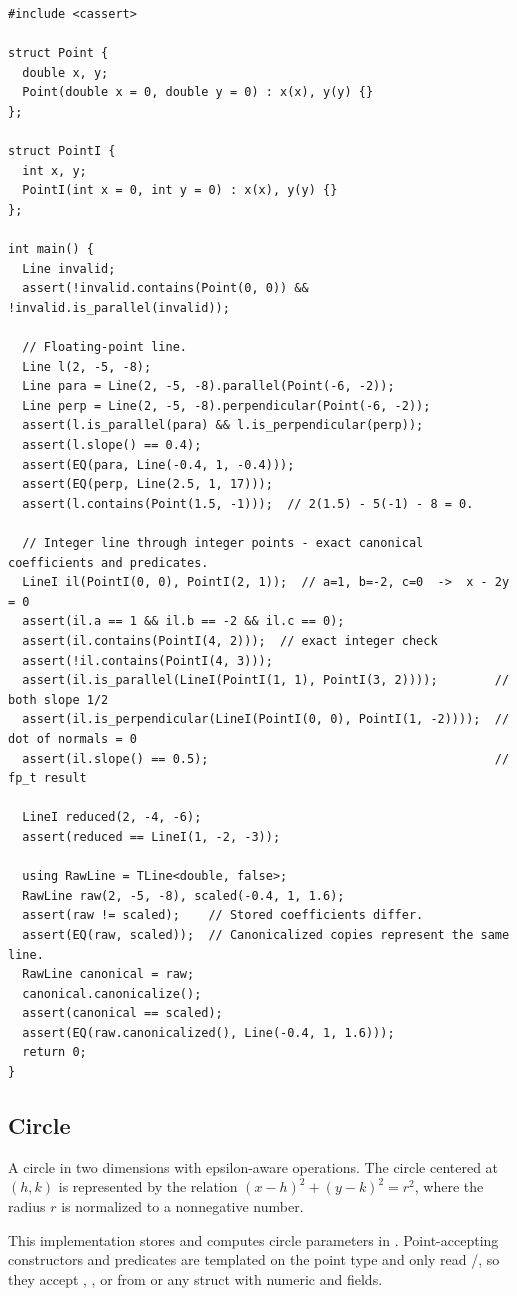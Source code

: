 \begin{lstlisting}[style=cpp]
#include <cassert>

struct Point {
  double x, y;
  Point(double x = 0, double y = 0) : x(x), y(y) {}
};

struct PointI {
  int x, y;
  PointI(int x = 0, int y = 0) : x(x), y(y) {}
};

int main() {
  Line invalid;
  assert(!invalid.contains(Point(0, 0)) && !invalid.is_parallel(invalid));

  // Floating-point line.
  Line l(2, -5, -8);
  Line para = Line(2, -5, -8).parallel(Point(-6, -2));
  Line perp = Line(2, -5, -8).perpendicular(Point(-6, -2));
  assert(l.is_parallel(para) && l.is_perpendicular(perp));
  assert(l.slope() == 0.4);
  assert(EQ(para, Line(-0.4, 1, -0.4)));
  assert(EQ(perp, Line(2.5, 1, 17)));
  assert(l.contains(Point(1.5, -1)));  // 2(1.5) - 5(-1) - 8 = 0.

  // Integer line through integer points - exact canonical coefficients and predicates.
  LineI il(PointI(0, 0), PointI(2, 1));  // a=1, b=-2, c=0  ->  x - 2y = 0
  assert(il.a == 1 && il.b == -2 && il.c == 0);
  assert(il.contains(PointI(4, 2)));  // exact integer check
  assert(!il.contains(PointI(4, 3)));
  assert(il.is_parallel(LineI(PointI(1, 1), PointI(3, 2))));        // both slope 1/2
  assert(il.is_perpendicular(LineI(PointI(0, 0), PointI(1, -2))));  // dot of normals = 0
  assert(il.slope() == 0.5);                                        // fp_t result

  LineI reduced(2, -4, -6);
  assert(reduced == LineI(1, -2, -3));

  using RawLine = TLine<double, false>;
  RawLine raw(2, -5, -8), scaled(-0.4, 1, 1.6);
  assert(raw != scaled);    // Stored coefficients differ.
  assert(EQ(raw, scaled));  // Canonicalized copies represent the same line.
  RawLine canonical = raw;
  canonical.canonicalize();
  assert(canonical == scaled);
  assert(EQ(raw.canonicalized(), Line(-0.4, 1, 1.6)));
  return 0;
}
\end{lstlisting}
\subsection{Circle}
\label{sec:7.1.3}
A circle in two dimensions with epsilon-aware operations. The circle centered at $(h, k)$ is represented by the relation $(x - h)^2 + (y - k)^2 = r^2$, where the radius $r$ is normalized to a nonnegative number.

This implementation stores and computes circle parameters in . Point-accepting constructors and predicates are templated on the point type  and only read /, so they accept , , or  from  or any struct with numeric  and  fields.

